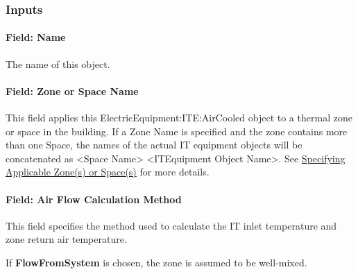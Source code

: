 \subsubsection{Inputs}\label{inputs-9-009}

\paragraph{Field: Name}\label{field-name-9-008}

The name of this object.

\paragraph{Field: Zone or Space Name}\label{iteq-field-zone-or-space-name-000}

This field applies this ElectricEquipment:ITE:AirCooled object to a thermal zone or space in the building. If a Zone Name is specified and the zone contains more than one Space, the names of the actual IT equipment objects will be concatenated as \textless{}Space Name\textgreater{} \textless{}ITEquipment Object Name\textgreater{}. See \hyperref[specifying-applicable-zones-or-spaces]{Specifying Applicable Zone(s) or Space(s)} for more details.

\paragraph{Field: Air Flow Calculation Method}\label{field-air-flow-calculation-method}

This field specifies the method used to calculate the IT inlet temperature and zone return air temperature.

If \textbf{FlowFromSystem} is chosen, the zone is assumed to be well-mixed.

